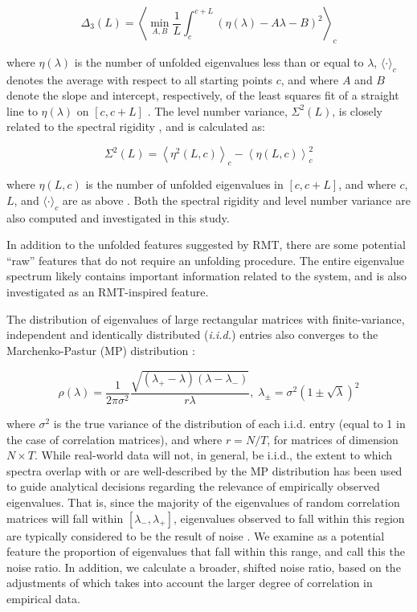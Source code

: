 \documentclass[NETN,manuscript]{stjour-new}
\begin{document}
\[
\Delta_3(L) = \left \langle \min_{A,B} \frac{1}{L} \int_c^{c+L} \left(  \eta(\lambda) -A \lambda - B \right)^2 \right \rangle_c
\]

where \(\eta(\lambda)\) is the number of unfolded eigenvalues less than or equal to \(\lambda\),
\(\langle \cdot \rangle_c\) denotes the average with respect to all starting points \(c\), and where
\(A\) and \(B\) denote the slope and intercept, respectively, of the least squares fit of a straight
line to \(\eta(\lambda)\) on \([c, c+L]\) \citep{guhrRandommatrixTheoriesQuantum1998a}. The level
number variance, \(\Sigma^2(L)\), is closely related to the spectral rigidity
\citep{mehtaRandomMatrices2004}, and is calculated as:

\[
\Sigma^2(L) = \left\langle \eta^2(L, c) \right\rangle_c - \left\langle \eta(L, c) \right\rangle^2_c
\]

where \(\eta(L, c)\) is the number of unfolded eigenvalues in \([c, c+ L]\), and where \(c\), \(L\),
and \(\langle \cdot \rangle_c\) are as above \citep{guhrRandommatrixTheoriesQuantum1998a}. Both the
spectral rigidity and level number variance are also computed and investigated in this study.

In addition to the unfolded features suggested by RMT, there are some potential ``raw'' features that
do not require an unfolding procedure. The entire eigenvalue spectrum likely contains important
information related to the system, and is also investigated as an RMT-inspired feature.

The distribution of eigenvalues of large rectangular matrices with finite-variance, independent and
identically distributed (\textit{i.i.d.}) entries also converges to the Marchenko-Pastur (MP)
distribution \citep{marcenkoDISTRIBUTIONEIGENVALUESSETS1967,yaoLargeSampleCovariance2015}:

\[
\rho(\lambda) =
\frac{1}{2\pi\sigma^2}
\frac{\sqrt{(\lambda_+ - \lambda)(\lambda - \lambda_-)}}{r\lambda}, \;
\lambda_{\pm} = \sigma^2\left(1 \pm \sqrt{\lambda}\right)^2
\]

where \(\sigma^2\) is the true variance of the distribution of each i.i.d. entry (equal to 1 in the
case of correlation matrices), and where \(r = N / T\), for matrices of dimension \(N \times T\).
While real-world data will not, in general, be i.i.d., the extent to which spectra overlap with or
are well-described by the MP distribution has been used to guide analytical decisions regarding the
relevance of empirically observed eigenvalues. That is, since the majority of the eigenvalues of
random correlation matrices will fall within \([\lambda_{-}, \lambda_{+}]\), eigenvalues observed to
fall within this region are typically considered to be the result of noise
\citep{veraartDenoisingDiffusionMRI2016,veraartDiffusionMRINoise2016,ulfarssonDimensionEstimationNoisy2008,macmahonCommunityDetectionCorrelation2015}.
We examine as a potential feature the proportion of eigenvalues that fall within this range, and
call this the noise ratio. In addition, we calculate a broader, shifted noise ratio, based on the
adjustments of \cite{almogUncoveringFunctionalSignature2019} which takes into account the larger
degree of correlation in empirical data.
\end{document}
